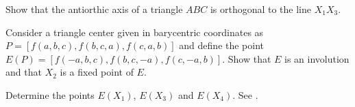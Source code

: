 \begin{exercise} Show that the
 antiorthic axis of a triangle $ABC$ is orthogonal to the line $X_1X_3$.
\end{exercise}

\begin{exercise} Consider a triangle center given in  barycentric coordinates as $P=[f(a,b,c),f(b,c,a), f(c,a,b)]$ and define the point $E(P)=[f(-a,b,c),f(b,c,-a), f(c, -a,b)]$. 
Show that $E $ is an involution   and   that $X_2$ is a fixed point of $E$. 

Determine the points $E(X_1)$, $E(X_3)$ and $E(X_4)$. See \cite{etc}.
 
 
\end{exercise}